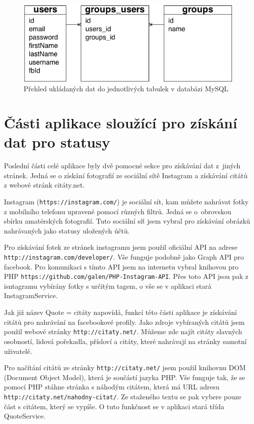 \documentclass[thesis=M,czech]{FITthesis}[2013/05/10]
\begin{document}
\begin{figure}[h]
\begin{center}
\includegraphics[width=5in]{figures/mysqlDataModel.png}
\caption{Přehled ukládaných dat do jednotlivých tabulek v databázi MySQL}
\label{fig:mysqlDataModel}
\end{center}
\end{figure}

\section{Části aplikace sloužící pro získání dat pro statusy}

Poslední části celé aplikace byly dvě pomocné sekce pro získávání dat z~jiných stránek. Jedná se o získání fotografií ze sociální sítě Instagram a získávání citátů z webové stránk citáty.net.

Instagram (\verb|https://instagram.com/|) je sociální sít, kam můžete nahrávat fotky z mobilního telefonu upravené pomocí různých filtrů. Jedná se o~obrovskou sbírku amatérských fotografií. Tuto sociální síť jsem vybral pro získávání obrázků nahrávaných jako statusy uložených účtů. 

Pro získávání fotek ze stránek instagramu jsem použil oficiální API na adrese \verb|http://instagram.com/developer/|. Vše funguje podobně jako Graph API pro facebook. Pro komunikaci s tímto API jsem na internetu vybral knihovou pro PHP \verb|https://github.com/galen/PHP-Instagram-API|. Přes toto API jsou pak z isntagramu vybírány fotky s určitým tagem, o vše se v aplikaci stará InstagramService.

Jak již název Quote = citáty napovídá, funkcí této části aplikace je získávání citátů pro nahrávání na facebookové profily. Jako zdroje vybíraných citátů jsem použil webové stránky \verb|http://citaty.net/|. Můžeme zde najít citáty slavných osobností, lidová pořekadla, přísloví a citáty, které nahrávají na stránky samotní uživatelé. 

Pro načítání citátů ze stránky \verb|http://citaty.net/| jsem použil knihovnu DOM (Document Object Model), která je součástí jazyka PHP. Vše funguje tak, že se pomocí PHP stáhne stránka s náhodým citátem, která má URL adresu \verb|http://citaty.net/nahodny-citat/|. Ze staženého textu se pak vybere pouze část s citátem, který se vypíše. O tuto funkčnost se v aplikaci stará třída QuoteService.
\end{document}
